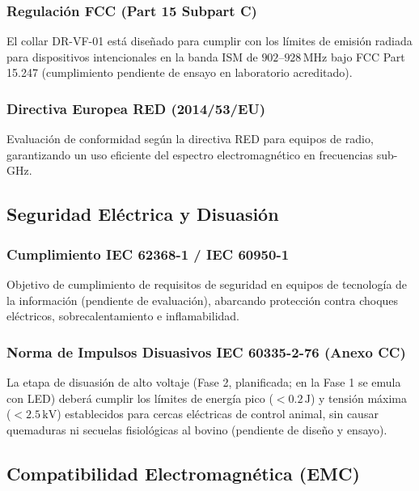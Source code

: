 \subsubsection{Regulación FCC (Part 15 Subpart C)}

El collar DR-VF-01 está diseñado para cumplir con los límites de emisión radiada para dispositivos intencionales en la banda ISM de $902\text{--}928\,\text{MHz}$ bajo FCC Part 15.247 (cumplimiento pendiente de ensayo en laboratorio acreditado).

\subsubsection{Directiva Europea RED (2014/53/EU)}

Evaluación de conformidad según la directiva RED para equipos de radio, garantizando un uso eficiente del espectro electromagnético en frecuencias sub-GHz.

\subsection{Seguridad Eléctrica y Disuasión}

\subsubsection{Cumplimiento IEC 62368-1 / IEC 60950-1}

Objetivo de cumplimiento de requisitos de seguridad en equipos de tecnología de la información (pendiente de evaluación), abarcando protección contra choques eléctricos, sobrecalentamiento e inflamabilidad.

\subsubsection{Norma de Impulsos Disuasivos IEC 60335-2-76 (Anexo CC)}

La etapa de disuasión de alto voltaje (Fase 2, planificada; en la Fase 1 se emula con LED) deberá cumplir los límites de energía pico ($< 0.2\,\text{J}$) y tensión máxima ($< 2.5\,\text{kV}$) establecidos para cercas eléctricas de control animal, sin causar quemaduras ni secuelas fisiológicas al bovino (pendiente de diseño y ensayo).

\subsection{Compatibilidad Electromagnética (EMC)}

